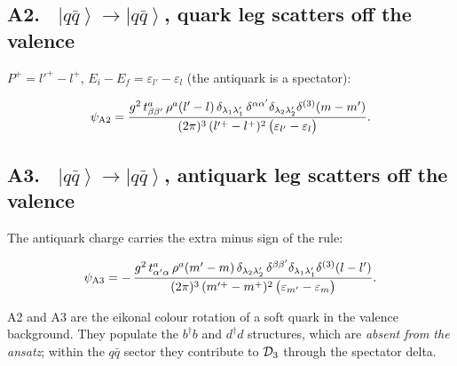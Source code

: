 \documentclass[11pt]{article}
\newcommand{\ibar}[2]{\draw[line width=1.1pt] (#1-0.13,#2) -- (#1+0.13,#2);}
\newcommand{\dg}{\dagger}
\newcommand{\eps}{\varepsilon}
\newcommand{\dthree}{\delta^{(3)}}
\newcommand{\ket}[1]{\left|#1\right\rangle}
\newcommand{\qk}[3]{q^{#1}_{#2}(#3)}
\newcommand{\aqk}[3]{\bar q^{#1}_{#2}(#3)}
\begin{document}
\subsection*{A2. \ $\ket{q\bar q}\to\ket{q\bar q}$, quark leg scatters off the valence}
\begin{center}
\end{center}
$P^{+}=l'^{+}-l^{+}$, $E_{i}-E_{f}=\eps_{l'}-\eps_{l}$ (the antiquark is a spectator):
\begin{res}
\begin{equation}
\psi_{\rm A2}=\frac{g^{2}\,t^{a}_{\beta\beta'}\,\rho^{a}(l'-l)\,\delta_{\lambda_{1}\lambda_{1}'}\,
\delta^{\alpha\alpha'}\delta_{\lambda_{2}\lambda_{2}'}\dthree(m-m')}
{(2\pi)^{3}\,(l'^{+}-l^{+})^{2}\,\big(\eps_{l'}-\eps_{l}\big)} .
\label{eq:A2}
\end{equation}
\end{res}

\subsection*{A3. \ $\ket{q\bar q}\to\ket{q\bar q}$, antiquark leg scatters off the valence}
\begin{center}
\end{center}
The antiquark charge carries the extra minus sign of the rule:
\begin{res}
\begin{equation}
\psi_{\rm A3}=-\,\frac{g^{2}\,t^{a}_{\alpha'\alpha}\,\rho^{a}(m'-m)\,\delta_{\lambda_{2}\lambda_{2}'}\,
\delta^{\beta\beta'}\delta_{\lambda_{1}\lambda_{1}'}\dthree(l-l')}
{(2\pi)^{3}\,(m'^{+}-m^{+})^{2}\,\big(\eps_{m'}-\eps_{m}\big)} .
\label{eq:A3}
\end{equation}
\end{res}
\noindent
A2 and A3 are the eikonal colour rotation of a soft quark in the valence background. They
populate the $b^{\dg}b$ and $d^{\dg}d$ structures, which are \emph{absent from the ansatz}; within
the $q\bar q$ sector they contribute to $\mathcal{D}_{3}$ through the spectator delta.
\end{document}
